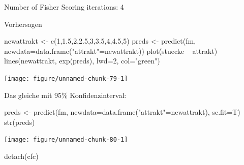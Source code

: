 \documentclass[a4paper,twoside]{tufte-book}\usepackage[]{graphicx}\usepackage[]{color}
\begin{document}
\begin{appendices}
\begin{Schunk}
\begin{Soutput}
Number of Fisher Scoring iterations: 4
\end{Soutput}
\end{Schunk}

Vorhersagen

\begin{Schunk}
\begin{Sinput}
newattrakt <- c(1,1.5,2,2.5,3,3.5,4,4.5,5)
preds <- predict(fm, newdata=data.frame("attrakt"=newattrakt))
plot(stuecke ~ attrakt)
lines(newattrakt, exp(preds), lwd=2, col="green")
\end{Sinput}

\texttt{[image: figure/unnamed-chunk-79-1]} \end{Schunk}

Das gleiche mit 95\% Konfidenzinterval:

\begin{Schunk}
\begin{Sinput}
preds <- predict(fm, newdata=data.frame("attrakt"=newattrakt), se.fit=T)
str(preds)
\end{Sinput}

\texttt{[image: figure/unnamed-chunk-80-1]} \begin{Sinput}
detach(cfc)
\end{Sinput}
\end{Schunk}


\end{appendices}


 
\end{document}
